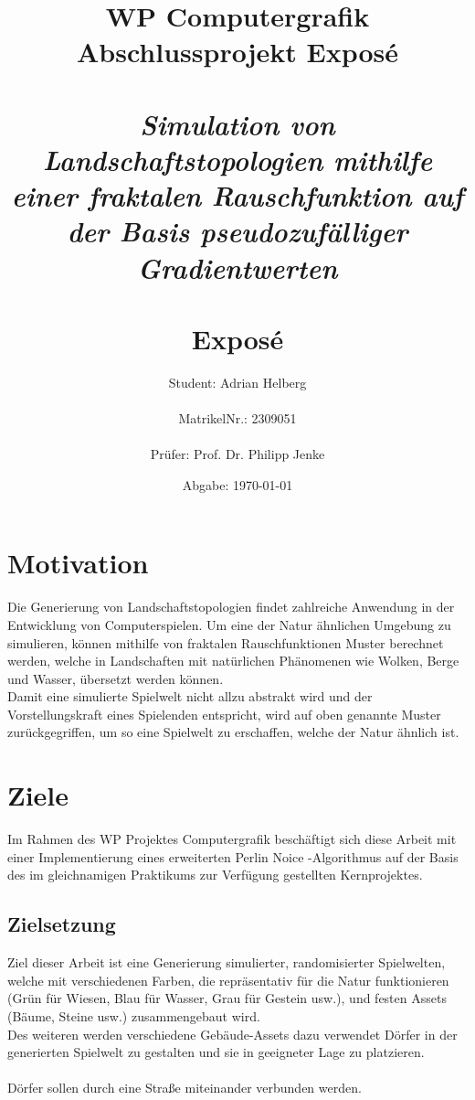 \documentclass[a4paper]{article}
\title{WP Computergrafik\\
    \small{Abschlussprojekt Exposé} \\
    \Large{\textit{\\Simulation von Landschaftstopologien mithilfe einer fraktalen Rauschfunktion auf der Basis pseudozufälliger Gradientwerten}} \\
    \Large{\textbf{\\Exposé}}}
\author{Student: Adrian Helberg \\ \\ MatrikelNr.: 2309051 \\ \\  Prüfer: Prof. Dr. Philipp Jenke}
\date{Abgabe: \today}
\begin{document}
	\maketitle
	\newpage 
	\tableofcontents 
	\newpage 
    

	\section{Motivation}	

	Die Generierung von Landschaftstopologien findet zahlreiche Anwendung in der Entwicklung von Computerspielen. Um eine der Natur ähnlichen Umgebung zu simulieren, können mithilfe 		von fraktalen Rauschfunktionen Muster berechnet werden, welche in Landschaften mit natürlichen Phänomenen wie Wolken, Berge und Wasser, übersetzt werden können.\\
	Damit eine simulierte Spielwelt nicht allzu abstrakt wird und der Vorstellungskraft eines Spielenden entspricht, wird auf oben genannte Muster zurückgegriffen, um so eine Spielwelt 			zu erschaffen, welche der Natur ähnlich ist.\\
	

	\section{Ziele}

	Im Rahmen des WP Projektes \glqq Computergrafik\grqq{}  besch\"aftigt sich diese Arbeit mit einer Implementierung eines erweiterten \glqq Perlin Noice\grqq{} -Algorithmus auf der 		Basis des im gleichnamigen Praktikums zur Verfügung gestellten Kernprojektes.

	\subsection{Zielsetzung}

	Ziel dieser Arbeit ist eine Generierung simulierter, randomisierter Spielwelten, welche mit verschiedenen Farben, die repräsentativ für die Natur funktionieren (Gr\"un für Wiesen, 			Blau f\"ur Wasser, Grau f\"ur Gestein usw.), und festen Assets (B\"aume, Steine usw.) \glqq zusammengebaut\grqq{}  wird.\\
	Des weiteren werden verschiedene Geb\"aude-Assets dazu verwendet D\"orfer in der generierten Spielwelt zu gestalten und sie in geeigneter Lage zu platzieren.\\ \\
	D\"orfer sollen durch eine Straße miteinander verbunden werden.
\end{document}
